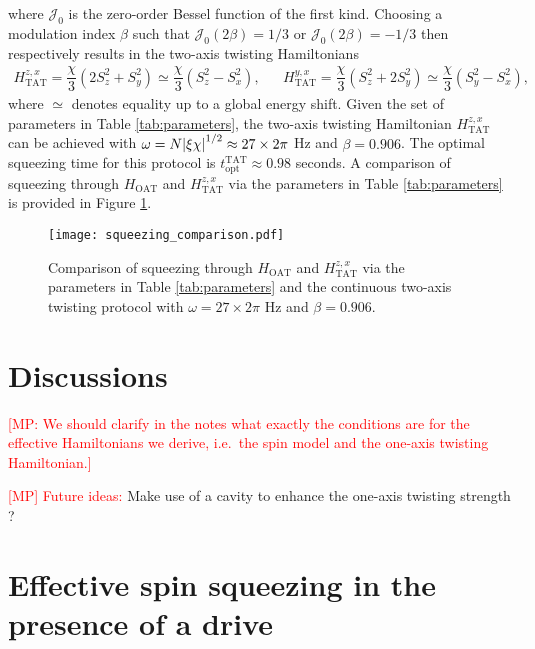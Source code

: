 \documentclass[aps,notitlepage,nofootinbib,11pt]{revtex4-1}
\renewcommand{\t}{\text} %
\newcommand{\f}[2]{\dfrac{#1}{#2}} %
\newcommand{\p}[1]{\left(#1\right)} %
\newcommand{\J}{\mathcal{J}}
\newcommand{\1}{\hat{\mathds{1}}}
\newcommand{\note}[1]{\textcolor{red}{#1}}
\begin{document}
where $\J_0$ is the zero-order Bessel function of the first kind.
Choosing a modulation index $\beta$ such that $\J_0\p{2\beta}=1/3$ or
$\J_0\p{2\beta}=-1/3$ then respectively results in the two-axis
twisting Hamiltonians
\begin{align}
  H_{\t{TAT}}^{z,x}
  = \f{\chi}{3} \p{2 S_z^2 + S_y^2}
  \simeq \f{\chi}{3} \p{S_z^2 - S_x^2},
  &&
  H_{\t{TAT}}^{y,x}
  = \f{\chi}{3} \p{S_z^2 + 2 S_y^2}
  \simeq \f{\chi}{3}\p{S_y^2 - S_x^2},
  \label{eq:H_TAT_drive}
\end{align}
where $\simeq$ denotes equality up to a global energy shift. Given the
set of parameters in Table \ref{tab:parameters}, the two-axis twisting
Hamiltonian $H_{\t{TAT}}^{z,x}$ can be achieved with
$\omega=N\abs{\xi\chi}^{1/2}\approx27\times2\pi$ Hz and $\beta=0.906$.
The optimal squeezing time for this protocol is
$t_{\t{opt}}^{\t{TAT}}\approx0.98$ seconds.  A comparison of squeezing
through $H_{\t{OAT}}$ and $H_{\t{TAT}}^{z,x}$ via the parameters in
Table \ref{tab:parameters} is provided in Figure
\ref{fig:squeezing_comparison}.

\begin{figure}[h]
  \centering
  \texttt{[image: squeezing\_comparison.pdf]}
  \caption{Comparison of squeezing through $H_{\t{OAT}}$ and
    $H_{\t{TAT}}^{z,x}$ via the parameters in Table
    \ref{tab:parameters} and the continuous two-axis twisting protocol
    with $\omega=27\times2\pi$ Hz and $\beta=0.906$.}
  \label{fig:squeezing_comparison}
\end{figure}


\section{Discussions}

\note{[MP: We should clarify in the notes what exactly the conditions
  are for the effective Hamiltonians we derive, i.e.~the spin model
  and the one-axis twisting Hamiltonian.]}

\note{[MP] Future ideas:} Make use of a cavity to enhance the one-axis
twisting strength \cite{hu2017vacuum}?


\appendix

\section{Effective spin squeezing in the presence of a drive}
\label{sec:effective_squeezing_drive}
\end{document}
